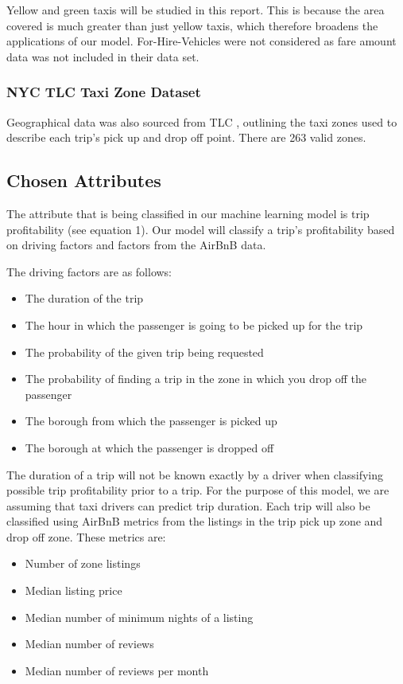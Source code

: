 \documentclass[11pt]{article}
\begin{document}
Yellow and green taxis will be studied in this report. This is because the area covered is much greater than just yellow taxis, which therefore broadens the applications of our model. For-Hire-Vehicles were not considered as fare amount data was not included in their data set. 

\subsubsection{NYC TLC Taxi Zone Dataset}
Geographical data was also sourced from TLC \cite{geo_data}, outlining the taxi zones used to describe each trip’s pick up and drop off point. There are 263 valid zones. 

\subsection{Chosen Attributes}
The attribute that is being classified in our machine learning model is trip profitability (see equation 1). Our model will classify a trip’s profitability based on driving factors and factors from the AirBnB data. 

The driving factors are as follows:
\begin{itemize} 
    \item The duration of the trip
    \item The hour in which the passenger is going to be picked up for the trip
    \item The probability of the given trip being requested
    \item The probability of finding a trip in the zone in which you drop off the passenger
    \item The borough from which the passenger is picked up
    \item The borough at which the passenger is dropped off

\end{itemize} 

The duration of a trip will not be known exactly by a driver when classifying possible trip profitability prior to a trip. For the purpose of this model, we are assuming that taxi drivers can predict trip duration. 
Each trip will also be classified using AirBnB metrics from the listings in the trip pick up zone and drop off zone. These metrics are: 
\begin{itemize} 
    \item Number of zone listings 
    \item Median listing price
    \item Median number of minimum nights of a listing
    \item Median number of reviews
    \item Median number of reviews per month
\end{itemize} 
\end{document}
